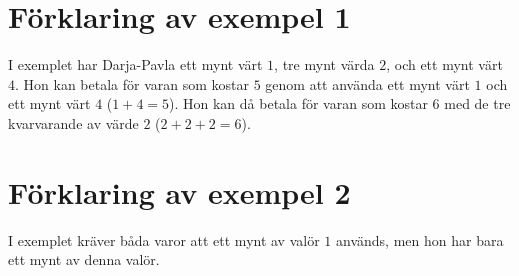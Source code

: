 \section*{Förklaring av exempel 1}
I exemplet har Darja-Pavla ett mynt värt $1$, tre mynt värda $2$, och ett mynt värt $4$.
Hon kan betala för varan som kostar $5$ genom att använda ett mynt värt $1$ och ett mynt värt $4$ ($1 + 4 = 5$).
Hon kan då betala för varan som kostar $6$ med de tre kvarvarande av värde $2$ ($2 + 2 + 2 = 6$).

\section*{Förklaring av exempel 2}
I exemplet kräver båda varor att ett mynt av valör $1$ används, men hon har bara ett mynt av denna valör.

